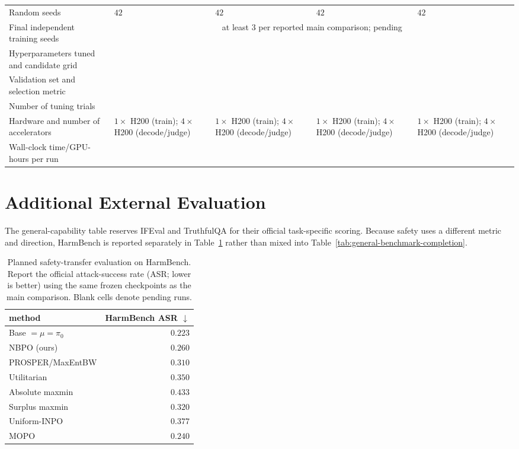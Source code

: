\documentclass{article}
\theoremstyle{remark}
\theoremstyle{plain}
\newcommand{\NBPO}{\textsc{NBPO}}
\begin{document}
\begin{table}[t]
\begin{tabular}{@{}p{}p{}p{}p{}p{}@{}}
Random seeds & $42$ & $42$ & $42$ & $42$ \\
Final independent training seeds & \multicolumn{4}{c}{at least $3$ per reported main comparison; pending} \\
Hyperparameters tuned and candidate grid & & & & \\
Validation set and selection metric & & & & \\
Number of tuning trials & & & & \\
Hardware and number of accelerators & $1\times$ H200 (train); $4\times$ H200 (decode/judge) & $1\times$ H200 (train); $4\times$ H200 (decode/judge) & $1\times$ H200 (train); $4\times$ H200 (decode/judge) & $1\times$ H200 (train); $4\times$ H200 (decode/judge) \\
Wall-clock time/GPU-hours per run & & & & \\
\bottomrule
\end{tabular}
\end{table}

\section{Additional External Evaluation}
\label{app:external-evaluation}
The general-capability table reserves IFEval and TruthfulQA for their official
task-specific scoring. Because safety uses a different metric and direction,
HarmBench is reported separately in Table~\ref{tab:safety-transfer} rather than
mixed into Table~\ref{tab:general-benchmark-completion}.

\begin{table}[t]
\centering\footnotesize
\setlength{\tabcolsep}{4.0pt}
\caption{Planned safety-transfer evaluation on HarmBench. Report the official attack-success rate (ASR; lower is better) using the same frozen checkpoints as the main comparison. Blank cells denote pending runs.}
\label{tab:safety-transfer}
\begin{tabular}{lr}
\toprule
method & HarmBench ASR $\downarrow$ \\
\midrule
Base $=\mu=\pi_0$ & $\mathbf{0.223}$ \\
\NBPO{} (ours) & $0.260$ \\
PROSPER/MaxEntBW & $0.310$ \\
Utilitarian & $0.350$ \\
Absolute maxmin & $0.433$ \\
Surplus maxmin & $0.320$ \\
Uniform-INPO & $0.377$ \\
MOPO & $0.240$ \\
\bottomrule
\end{tabular}
\end{table}
\end{document}
